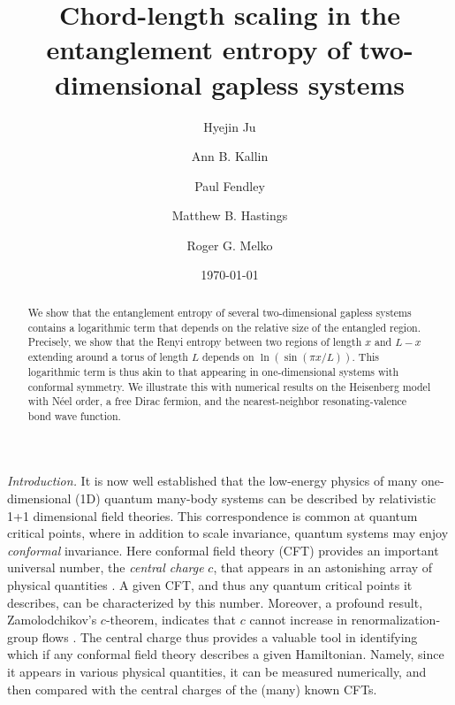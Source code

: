 \documentclass[prl,aps,twocolumn,floatfix,amsmath,amssymb,superscriptaddress,tightenlines]{revtex4}
\begin{document}
\date{\today}
\title{Chord-length scaling in the entanglement entropy of
  two-dimensional gapless systems}

\author{Hyejin Ju}

\author{Ann B. Kallin}

\author{Paul Fendley}

\author{Matthew B. Hastings}

\author{Roger G. Melko}

\begin{abstract} 
We show that the entanglement entropy of several two-dimensional
gapless systems contains a logarithmic term that depends 
on the relative size of the entangled region.
Precisely, we show that the Renyi entropy between two
regions of length $x$ and $L-x$ extending around a torus of length
$L$ depends on $\ln(\sin(\pi x/L))$. This logarithmic term is thus
akin to that appearing in one-dimensional systems with conformal symmetry. We
illustrate this with numerical results on the Heisenberg model with
N\'eel order, a free Dirac fermion, and the nearest-neighbor resonating-valence
bond wave function.


 
\end{abstract}
\maketitle

{\it Introduction.} It is now well established that the low-energy
physics of many one-dimensional (1D) quantum many-body systems can be
described by relativistic 1+1 dimensional field theories.  This
correspondence is common at quantum critical points, where in addition
to scale invariance, quantum systems may enjoy {\it conformal}
invariance. Here conformal field theory (CFT) provides an important
universal number, the {\it central charge} $c$, that appears in an astonishing array of physical
quantities \cite{Cardyubiquitous}. A given CFT, and
thus any quantum critical points it describes, can be
characterized by this number. Moreover, a profound result, Zamolodchikov's
$c$-theorem, indicates that $c$ cannot increase in
renormalization-group flows \cite{Zamo}. The central charge thus
provides a valuable tool in identifying which if any conformal field
theory describes a given Hamiltonian. Namely, since it appears in
various physical quantities, it can be measured numerically, and then
compared with the central charges of the (many) known
CFTs. 
\end{document}
